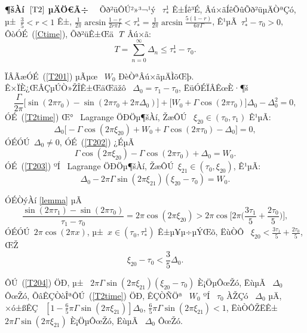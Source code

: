 \documentclass[12pt,openany,CJK,oneside]{cctbook}
\begin{document}
{{\heiti \textbf{¶šÀí\ $\ref{T2}$ µÄÖ€Ã÷} }~~Õð²üÔÚ²»³¬¹ý \ $\tau^1_*$ Ê±Íê³É, Âú×ãÍêÕûÕð²üµÄÒªÇó, µ±\ $\frac{3}{5}<r<1$ Ê±,
$\frac{1}{2\pi}\arcsin\frac{1-r}{2r\pi\Gamma}<\tau^1_*=\frac{1}{2\pi}\arcsin\frac{5(1-r)}{6\pi\Gamma}$, Ê¹µÃ\ $\tau^1_*-\tau_0>0$, ÔòÓÉ\ (\ref{Ctime}), Õð²üÊ±Œä\ $\emph{T}$ Âú×ã:
\begin{equation}\label{T201}
 T=\sum_{n=0}^{\infty}\Delta_n\leq\tau^1_*-\tau_0.
 \end{equation}

ÏÂÃæÓÉ\ (\ref{T201}) µÃµœ \ $W_0$ ÐèÒªÂú×ãµÄÌõŒþ.
Ê×ÏÈ¿ŒÂÇµÚÒ»ŽÎÊ±ŒäŒäžô \ $\Delta_0=\tau_1-\tau_0$, ËüÓÉÏÂÊœÈ·¶š
  \begin{equation}\label{T2time}
  \frac{\Gamma}{2\pi}\big[\sin(2\pi\tau_0)-\sin(2\pi\tau_0+2\pi\Delta_0)\big]+\big[W_0+\Gamma\cos(2\pi\tau_0)\big]\Delta_0-\Delta_0^{2}=0,
\end{equation}
ÓÉ\ (\ref{T2time}) Œ° \ Lagrange ÖÐÖµ¶šÀí, ŽæÔÚ \ $\xi_{20}\in(\tau_0,\tau_1)$  Ê¹µÃ:
\begin{equation}\label{T202}
   \Delta_0\big[-\Gamma\cos(2\pi\xi_{20})+W_0+\Gamma\cos(2\pi\tau_0)-\Delta_0\big]=0,
\end{equation}
ÓÉÓÚ\ $\Delta_0\neq 0$, ÓÉ\ (\ref{T202}) ¿ÉµÃ
\begin{equation}\label{T203}
  \Gamma\cos(2\pi\xi_{20})-\Gamma\cos(2\pi\tau_0)+\Delta_0=W_0.
\end{equation}
ÓÉ\ (\ref{T203}) ºÍ \ Lagrange ÖÐÖµ¶šÀí, ŽæÔÚ\ $\xi_{21}\in(\tau_0,\xi_{20})$, Ê¹µÃ:
\begin{equation}\label{T204}
  \Delta_0-2\pi\Gamma\sin(2\pi\xi_{21})(\xi_{20}-\tau_0)=W_0.
\end{equation}

ÓÉÒýÀí \;\ref{lemma} µÃ
\begin{equation*}
  \frac{\sin(2\pi\tau_1)-\sin(2\pi\tau_0)}{\tau_1-\tau_0}=2\pi\cos(2\pi\xi_{20})>2\pi\cos\Big[2\pi \Big(\frac{3\tau_1}{5}+\frac{2\tau_0}{5}\Big)\Big],
\end{equation*}
 ÓÉÓÚ\ $2\pi\cos(2\pi x)$, µ±\ $x\in(\tau_0,\tau^1_*)$ Ê±µ¥µ÷µÝŒõ,  ËùÒÔ \ $\xi_{20}<\frac{3\tau_1}{5}+\frac{2\tau_0}{5}$, ŒŽ
 \begin{equation}\label{T205}
  \xi_{20}-\tau_0<\frac{3}{5}\Delta_0.
\end{equation}

ÔÚ\ (\ref{T204}) ÖÐ, µ± \ $2\pi\Gamma\sin(2\pi\xi_{21})(\xi_{20}-\tau_0)$ È¡ÖµÔœŽó, ËùµÃ \ $\Delta_0$ ÔœŽó, ÕâÊÇÒòÎªÔÚ\ (\ref{T2time}) ÖÐ,
ÊÇÒÑÖª \ $W_0$ ºÍ \ $\tau_0$ ÀŽÇó \ $\Delta_0$ µÄ, ×ó±ßÊÇ \ $[1-\frac{6}{5}\pi\Gamma\sin(2\pi\xi_{21})]\Delta_0$,
$\frac{6}{5}\pi\Gamma\sin(2\pi\xi_{21})<1$,
ËùÒÔŽËÊ± \ $2\pi\Gamma\sin(2\pi\xi_{21})$ È¡ÖµÔœŽó, ËùµÃ \ $\Delta_0$ ÔœŽó.

}
\end{document}
